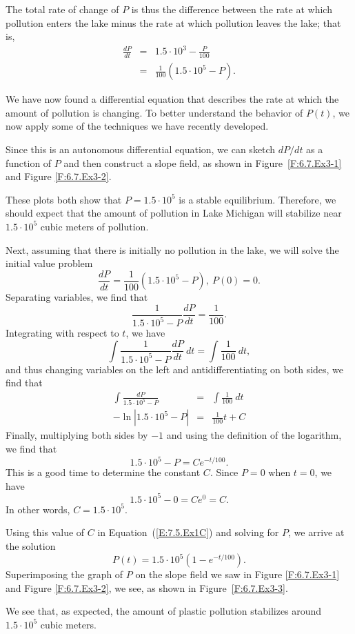 \begin{example}
The total rate of change of $P$ is thus the difference between the rate at which
pollution enters the lake minus the rate at which pollution leaves the
lake;  that is,
\begin{eqnarray*}
\frac{dP}{dt} & = &1.5\cdot10^{3}-\frac{P}{100} \\
                   & = & \frac{1}{100}(1.5\cdot10^{5} - P).
\end{eqnarray*}

We have now found a differential equation that describes the rate
at which the amount of pollution is changing.  To better understand the
behavior of $P(t)$, we now apply some
of the techniques we have recently developed.

Since this is an autonomous differential equation, we can sketch
$dP/dt$ as a function of $P$ and then construct a slope field, as shown in Figure~\ref{F:6.7.Ex3-1} and Figure \ref{F:6.7.Ex3-2}.

These plots both show that $P=1.5\cdot10^5$ is a stable equilibrium.  Therefore,
we should expect that the amount of pollution in Lake Michigan will
stabilize near $1.5\cdot10^5$ cubic meters of pollution.

Next, assuming that there is initially no pollution in the lake, we will
solve the initial value problem
$$
\frac{dP}{dt} = \frac{1}{100}(1.5\cdot10^{5} - P), \ P(0) = 0.
$$
Separating variables, we find that
$$
\frac1{1.5\cdot10^5-P} \frac{dP}{dt} = \frac1{100}.
$$
Integrating with respect to $t$, we have 
$$  \int \frac1{1.5\cdot10^5-P} \frac{dP}{dt}~dt = \int \frac1{100}~dt,$$
and thus changing variables on the left and antidifferentiating on both sides, we find that
\begin{eqnarray*}
  \int \frac{dP}{1.5\cdot10^5-P} &=& \int \frac1{100}~dt \\
  -\ln|1.5\cdot10^5 - P| & = & \frac1{100}t + C
\end{eqnarray*}
Finally, multiplying both sides by $-1$ and using the definition of the logarithm, we find that
\begin{equation} \label{E:7.5.Ex1C}  1.5\cdot10^5 - P = C e^{-t/100}.
\end{equation}
This is a good time to determine the constant $C$.  Since $P =
0$ when $t=0$, we have
$$
1.5\cdot 10^5 - 0 = Ce^0 = C.
$$
In other words, $C=1.5\cdot10^5$. 

Using this value of $C$ in Equation~(\ref{E:7.5.Ex1C}) and solving for $P$, we arrive at the solution
$$ P(t) = 1.5\cdot10^5(1-e^{-t/100}).$$
Superimposing the graph of $P$ on the slope field we saw in Figure \ref{F:6.7.Ex3-1} and Figure \ref{F:6.7.Ex3-2}, we see, as shown in Figure~\ref{F:6.7.Ex3-3}.

We see that, as expected, the amount of plastic pollution stabilizes around
$1.5\cdot10^5$ cubic meters.
\end{example}

